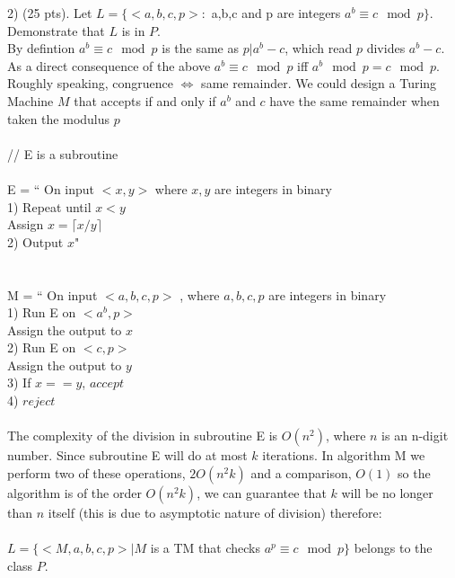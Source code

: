 \documentclass{report}
\begin{document}
2) (25 pts). Let $L = \{< a,b,c,p >: $ a,b,c and p  are integers $a^b \equiv c \mod p \}$. Demonstrate that $L$ is in $P$.\\[0.2in] 
By defintion $a^b \equiv c \mod p $ is the same as $ p | a^b - c$, which read $p$ divides $a^b - c$. As a direct consequence of the above $a^b \equiv c \mod p $ iff $a^b \mod  p = c \mod p$. Roughly speaking, congruence $\iff$ same remainder. We could design a Turing Machine $M$ that accepts if and only if $a^b$ and $c$ have the same remainder when taken the modulus $p$  \\ \\
// E is a subroutine \\ \\ 
E = `` On input $<x,y>$ where $x,y$ are integers in binary\\
1) Repeat until $x < y$ \\
	\indent \indent  Assign $x = \lceil x/y\rceil $ \\
2) Output $x$" \\ \\ \\ M = `` On input $<a,b,c,p>$ , where $a,b,c,p$ are integers in binary \\
1) Run E on $< a^b, p>$ \\
 \indent \indent Assign the output to $x$ \\
 2) Run E on $<c,p>$  \\
 \indent \indent Assign the output to $y$ \\
 3) If $x == y$, $ accept$ \\
 4) $reject$ \\ \\
 
 
 The complexity of the division in subroutine E  is $O(n^2)$, where $n$ is an n-digit number. Since subroutine E will do at most $k$ iterations. In algorithm M we perform two of these operations, $2O(n^2k)$ and a comparison, $O(1)$ so the algorithm is of the order $O(n^2k)$, we can guarantee that $k$ will be no longer than $n$ itself (this is due to asymptotic nature of division) therefore: \\ \\
 $L = \{ <M,a,b,c,p> | M$ is a TM that checks $a^p \equiv c \mod p\} $ belongs to the class $P$. \\ \\ \\ \\
 
 
 
\end{document}
